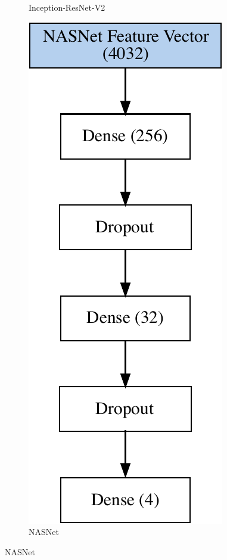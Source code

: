 \begin{figure}[h!]
\begin{subfigure}[b]{0.3\linewidth}
    \caption{Inception-ResNet-V2} 
    \label{image-classification-model:inception} 
    \vspace{2ex}
  \end{subfigure}%
  \begin{subfigure}[b]{0.3\linewidth}
    \centering
    \includegraphics[width=0.75	\linewidth]{graphics/image-classification-results/model/nasnet.pdf} 
    \caption{NASNet} 
    \label{image-classification-model:nasnet} 
    \vspace{2ex}
  \end{subfigure} 
  \centering
\end{figure}

